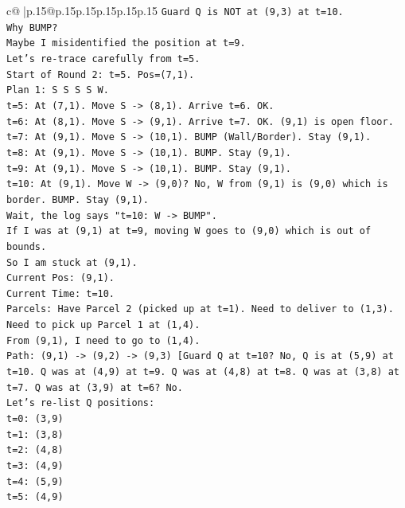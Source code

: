 \documentclass{article}
\begin{document}
{\begin{supertabular}{c@{$\;$}|p{.15\linewidth}@{}p{.15\linewidth}p{.15\linewidth}p{.15\linewidth}p{.15\linewidth}p{.15\linewidth}}
{{{\texttt{Guard Q is NOT at (9,3) at t=10.} \\
\texttt{Why BUMP?} \\
\texttt{Maybe I misidentified the position at t=9.} \\
\texttt{Let's re{-}trace carefully from t=5.} \\
\texttt{Start of Round 2: t=5. Pos=(7,1).} \\
\texttt{Plan 1: S S S S W.} \\
\texttt{t=5: At (7,1). Move S {-}> (8,1). Arrive t=6. OK.} \\
\texttt{t=6: At (8,1). Move S {-}> (9,1). Arrive t=7. OK. (9,1) is open floor.} \\
\texttt{t=7: At (9,1). Move S {-}> (10,1). BUMP (Wall/Border). Stay (9,1).} \\
\texttt{t=8: At (9,1). Move S {-}> (10,1). BUMP. Stay (9,1).} \\
\texttt{t=9: At (9,1). Move S {-}> (10,1). BUMP. Stay (9,1).} \\
\texttt{t=10: At (9,1). Move W {-}> (9,0)? No, W from (9,1) is (9,0) which is border. BUMP. Stay (9,1).} \\
\texttt{Wait, the log says "t=10: W {-}> BUMP".} \\
\texttt{If I was at (9,1) at t=9, moving W goes to (9,0) which is out of bounds.} \\
\texttt{So I am stuck at (9,1).} \\
\texttt{Current Pos: (9,1).} \\
\texttt{Current Time: t=10.} \\
\texttt{Parcels: Have Parcel 2 (picked up at t=1). Need to deliver to (1,3).} \\
\texttt{Need to pick up Parcel 1 at (1,4).} \\
\texttt{From (9,1), I need to go to (1,4).} \\
\texttt{Path: (9,1) {-}> (9,2) {-}> (9,3) {[}Guard Q at t=10? No, Q is at (5,9) at t=10. Q was at (4,9) at t=9. Q was at (4,8) at t=8. Q was at (3,8) at t=7. Q was at (3,9) at t=6? No.} \\
\texttt{Let's re{-}list Q positions:} \\
\texttt{t=0: (3,9)} \\
\texttt{t=1: (3,8)} \\
\texttt{t=2: (4,8)} \\
\texttt{t=3: (4,9)} \\
\texttt{t=4: (5,9)} \\
\texttt{t=5: (4,9)} \\
}}}
\end{supertabular}}
\end{document}

